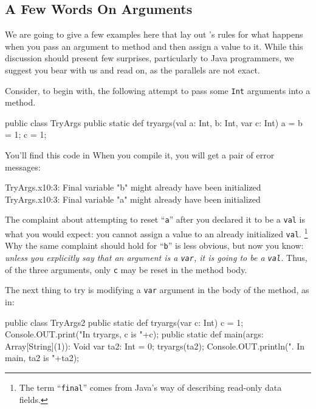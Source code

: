 \subsection{A Few Words On Arguments}
We are going
to give a few examples here that lay out \Xten's rules for what happens when you pass
an argument to method and then assign a value to it.  While this discussion should present
few surprises, particularly to Java programmers, we suggest you bear with us and read on,
as the parallels are not exact.

Consider, to begin with, the following attempt to pass some {\tt Int} arguments into a method.
\begin{xtennum}[]
public class TryArgs {
   public static def tryargs(val a: Int, b: Int, var c: Int) {
      a = b = 1;  
      c = 1;       
   }
}
\end{xtennum}
You'll find this code in 
When you compile it, you will get a pair of error messages:
\begin{xten}
TryArgs.x10:3: Final variable "b" might already have been
               initialized
TryArgs.x10:3: Final variable "a" might already have been
               initialized
\end{xten}
The complaint about attempting to reset ``{\tt a}'' after you declared it to be a
{\tt val} is what you would expect: you cannot assign a value to an already initialized
 {\tt val}.
 \footnote{
 The term ``{\tt final}'' comes from Java's way of describing read-only
 data fields.
 }
Why the same complaint should hold for ``{\tt b}'' is less
obvious, but now you know: {\em unless you explicitly say that an argument is a {\tt var}, it is
going to be a {\tt val}.}   Thus, of the three arguments, only {\tt c} may be reset in the
method body.

The next thing to try is modifying a {\tt var} argument in the body of the method, as in: 
\begin{xtennum}[]
public class TryArgs2 {
   public static def tryargs(var c: Int) {
      c = 1;   
      Console.OUT.print("In tryargs, c is "+c);
   }
   public static def main(args: Array[String](1)): Void {
      var ta2: Int = 0;
      tryargs(ta2);
      Console.OUT.println(".  In main, ta2 is "+ta2);     
   }
}
\end{xtennum}
